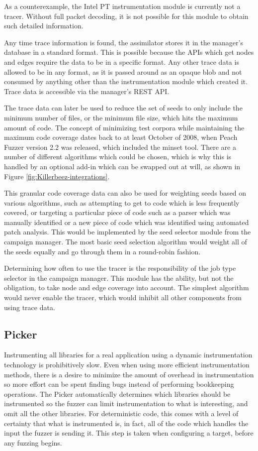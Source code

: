 As a counterexample, the Intel PT instrumentation module is currently not a
tracer.  Without full \IPT{} packet decoding, it is not possible for this
module to obtain such detailed information.

Any time trace information is found, the assimilator stores it in the manager's
database in a standard format.  This is possible because the APIs which get
nodes and edges require the data to be in a specific format.  Any other trace
data is allowed to be in any format, as it is passed around as an opaque blob
and not consumed by anything other than the instrumentation module which
created it.  Trace data is accessible via the manager's REST API.

The trace data can later be used to reduce the set of seeds to only include the minimum
number of files, or the minimum file size, which hits the maximum amount of
code. The concept of minimizing test corpora while maintaining the maximum code
coverage dates back to at least October of 2008, when Peach Fuzzer version 2.2
was released, which included the minset tool.\cite{peach22}  There are a number
of different algorithms which could be chosen, which is why this is handled by
an optional add-in which can be swapped out at will, as shown in Figure
\ref{fig:Killerbeez-integrations}.

This granular code coverage data can also be used for weighting seeds based on
various algorithms, such as attempting to get to code which is less frequently
covered, or targeting a particular piece of code such as a parser which was
manually identified or a new piece of code which was identified using automated
patch analysis. This would be implemented by the seed selector module from the
campaign manager.  The most basic seed selection algorithm would weight
all of the seeds equally and go through them in a round-robin fashion.

Determining how often to use the tracer is the responsibility of the job
type selector in the campaign manager.  This module has the ability, but
not the obligation, to take node and edge coverage into account.  The simplest
algorithm would never enable the tracer, which would inhibit all other
components from using trace data.

\subsection{Picker} \label{Picker}
Instrumenting all libraries for a real application using a dynamic
instrumentation technology is prohibitively slow. Even when using more
efficient instrumentation methods, there is a desire to minimize the amount of
overhead in instrumentation so more effort can be spent finding bugs instead of
performing bookkeeping operations.  The Picker automatically determines which
libraries should be instrumented so the fuzzer can limit instrumentation to
what is interesting, and omit all the other libraries. For deterministic
code, this comes with a level of certainty that what is instrumented is, in
fact, all of the code which handles the input the fuzzer is sending it. This
step is taken when configuring a target, before any fuzzing begins.

